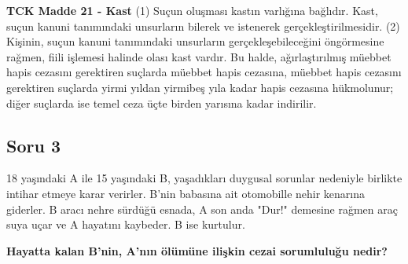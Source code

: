 \documentclass[a4paper, 11pt, twocolumn]{article}
\newenvironment{lawbox}{%
    \par\noindent
    \begin{tcolorbox}[
        colback=lawbg,
        colframe=boxcolor,
        fonttitle=\bfseries,
        boxrule=0.5pt,
        left=3pt,
        right=3pt,
        top=3pt,
        bottom=3pt,
        width=\columnwidth,
        arc=2pt,
        before skip=0.2cm,
        after skip=0.2cm
    ]
    \footnotesize\itshape
}{\end{tcolorbox}}
\begin{document}
\begin{lawbox}
\textbf{TCK Madde 21 - Kast}
\newline
(1) Suçun oluşması kastın varlığına bağlıdır. Kast, suçun kanuni tanımındaki unsurların bilerek ve istenerek gerçekleştirilmesidir.
\newline
(2) Kişinin, suçun kanuni tanımındaki unsurların gerçekleşebileceğini öngörmesine rağmen, fiili işlemesi halinde olası kast vardır. Bu halde, ağırlaştırılmış müebbet hapis cezasını gerektiren suçlarda müebbet hapis cezasına, müebbet hapis cezasını gerektiren suçlarda yirmi yıldan yirmibeş yıla kadar hapis cezasına hükmolunur; diğer suçlarda ise temel ceza üçte birden yarısına kadar indirilir.
\end{lawbox}

\newpage

\subsection*{Soru 3}
18 yaşındaki A ile 15 yaşındaki B, yaşadıkları duygusal sorunlar nedeniyle birlikte intihar etmeye karar verirler. B'nin babasına ait otomobille nehir kenarına giderler. B aracı nehre sürdüğü esnada, A son anda "Dur!" demesine rağmen araç suya uçar ve A hayatını kaybeder. B ise kurtulur.

\textbf{Hayatta kalan B'nin, A'nın ölümüne ilişkin cezai sorumluluğu nedir?}
\end{document}

